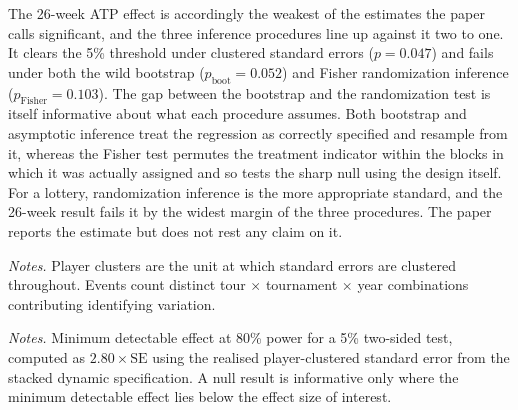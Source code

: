 The 26-week ATP effect is accordingly the weakest of the estimates the paper calls significant, and the three inference procedures line up against it two to one. It clears the 5\% threshold under clustered standard errors ($p = 0.047$) and fails under both the wild bootstrap ($p_{\text{boot}} = 0.052$) and Fisher randomization inference ($p_{\text{Fisher}} = 0.103$). The gap between the bootstrap and the randomization test is itself informative about what each procedure assumes. Both bootstrap and asymptotic inference treat the regression as correctly specified and resample from it, whereas the Fisher test permutes the treatment indicator within the blocks in which it was actually assigned and so tests the sharp null using the design itself. For a lottery, randomization inference is the more appropriate standard, and the 26-week result fails it by the widest margin of the three procedures. The paper reports the estimate but does not rest any claim on it.

\begin{table}[htbp]
\centering
\caption{Sample and Cluster Counts}
\label{tab:clusters}
\begin{threeparttable}
\small

\begin{tablenotes}
\footnotesize
\item \textit{Notes.} Player clusters are the unit at which standard errors are clustered throughout. Events count distinct tour $\times$ tournament $\times$ year combinations contributing identifying variation.
\end{tablenotes}
\end{threeparttable}
\end{table}

\begin{table}[htbp]
\centering
\caption{Minimum Detectable Effects (Ranking Points, 80\% Power)}
\label{tab:mde}
\begin{threeparttable}
\small

\begin{tablenotes}
\footnotesize
\item \textit{Notes.} Minimum detectable effect at 80\% power for a 5\% two-sided test, computed as $2.80 \times \text{SE}$ using the realised player-clustered standard error from the stacked dynamic specification. A null result is informative only where the minimum detectable effect lies below the effect size of interest.
\end{tablenotes}
\end{threeparttable}
\end{table}

